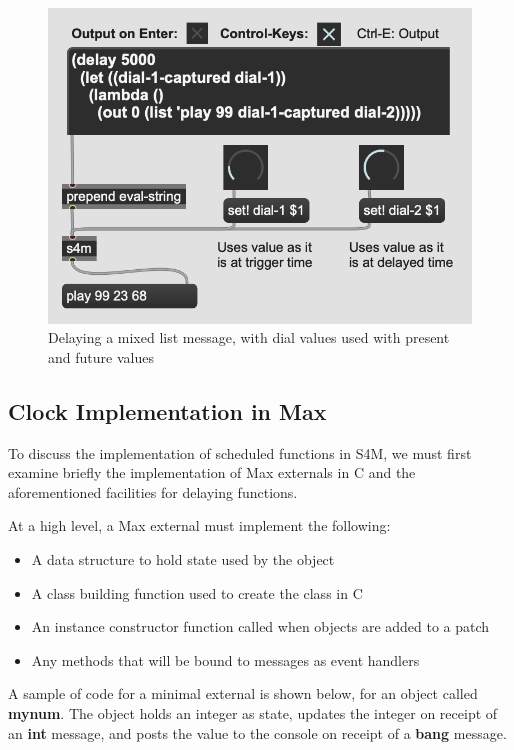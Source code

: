 \documentclass[acmsmall, anonymous, review]{acmart}
\begin{document}
\begin{figure}[H]
  \centering
  \includegraphics[width=.5\linewidth]{fig-6-s4m-delay}
  \caption{Delaying a mixed list message, with dial values used with present and future values}
\end{figure}

\subsection{Clock Implementation in Max}

To discuss the implementation of scheduled functions in S4M, we must first examine
briefly the implementation of Max externals in C and the aforementioned 
facilities for delaying functions.

At a high level, a Max external must implement the following:

\begin{itemize}
\item A data structure to hold state used by the object
\item A class building function used to create the class in C
\item An instance constructor function called when objects are added to a patch
\item Any methods that will be bound to messages as event handlers
\end{itemize}

A sample of code for a minimal external is shown below,
for an object called \textbf{mynum}. The object holds an integer as state,
updates the integer on receipt of an \textbf{int} 
message, and posts the value to the console on receipt of a \textbf{bang}
message.
\end{document}
